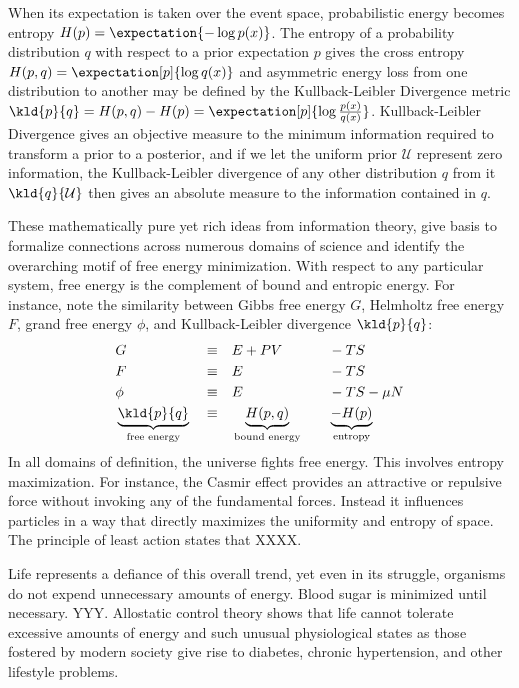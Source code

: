 When its expectation is taken over the event space, probabilistic energy becomes entropy $H(p) = \expectation{-\log{p(x)}}$. The entropy of a probability distribution $q$ with respect to a prior expectation $p$ gives the cross entropy $H(p,q) = \expectation[p]{ \log{ q(x) } }$ and asymmetric energy loss from one distribution to another may be defined by the Kullback-Leibler Divergence metric $\kld{p}{q} = H(p,q) - H(p) = \expectation[p]{ \log {\frac {p(x)}{q(x)} } }$. Kullback-Leibler Divergence gives an objective measure to the minimum information required to transform a prior to a posterior, and if we let the uniform prior $\mathcal{U}$ represent zero information, the Kullback-Leibler divergence of any other distribution $q$ from it $\kld{q}{\mathcal{U}}$ then gives an absolute measure to the information contained in $q$. 

These mathematically pure yet rich ideas from information theory, give basis to formalize connections across numerous domains of science and identify the overarching motif of free energy minimization. With respect to any particular system, free energy is the complement of bound and entropic energy. For instance, note the similarity between Gibbs free energy $G$, Helmholtz free energy $F$, grand free energy $\phi$, and Kullback-Leibler divergence $\kld{p}{q}$:
\begin{alignat*}{4}
& G    && \equiv && {} E + PV \quad && - TS \\
& F    && \equiv && {} E      \quad && - TS \\
& \phi && \equiv && {} E      \quad && - TS - \mu N \\
& \underbrace{\kld{p}{q}}_{\text{free energy}} && \equiv && {} \underbrace{H(p,q)}_{\text{bound energy}} \quad && \underbrace{- H(p)}_{\text{entropy}}
\end{alignat*}
In all domains of definition, the universe fights free energy. This involves entropy maximization. For instance, the Casmir effect provides an attractive or repulsive force without invoking any of the fundamental forces. Instead it influences particles in a way that directly maximizes the uniformity and entropy of space. The principle of least action states that XXXX.

Life represents a defiance of this overall trend, yet even in its struggle, organisms do not expend unnecessary amounts of energy. Blood sugar is minimized until necessary. YYY. Allostatic control theory shows that life cannot tolerate excessive amounts of energy and such unusual physiological states as those fostered by modern society give rise to diabetes, chronic hypertension, and other lifestyle problems.

